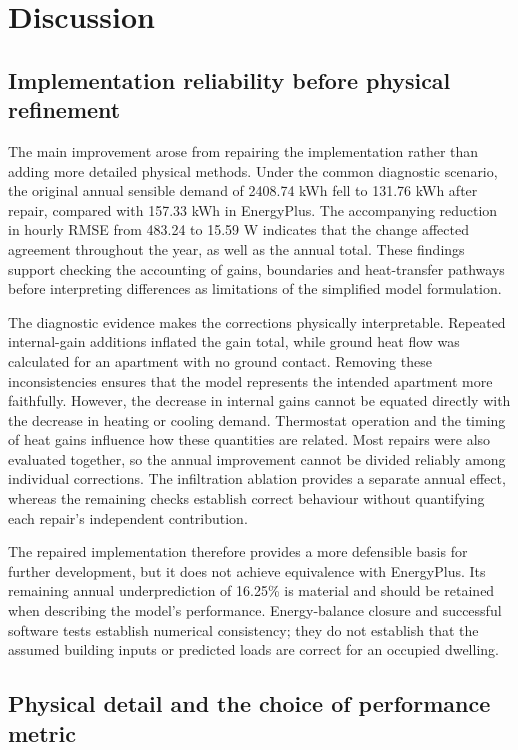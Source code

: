 \section{Discussion}

\subsection{Implementation reliability before physical refinement}

The main improvement arose from repairing the implementation rather than adding more detailed physical methods. Under the common diagnostic scenario, the original annual sensible demand of 2408.74 kWh fell to 131.76 kWh after repair, compared with 157.33 kWh in EnergyPlus. The accompanying reduction in hourly RMSE from 483.24 to 15.59 W indicates that the change affected agreement throughout the year, as well as the annual total. These findings support checking the accounting of gains, boundaries and heat-transfer pathways before interpreting differences as limitations of the simplified model formulation.

The diagnostic evidence makes the corrections physically interpretable. Repeated internal-gain additions inflated the gain total, while ground heat flow was calculated for an apartment with no ground contact. Removing these inconsistencies ensures that the model represents the intended apartment more faithfully. However, the decrease in internal gains cannot be equated directly with the decrease in heating or cooling demand. Thermostat operation and the timing of heat gains influence how these quantities are related. Most repairs were also evaluated together, so the annual improvement cannot be divided reliably among individual corrections. The infiltration ablation provides a separate annual effect, whereas the remaining checks establish correct behaviour without quantifying each repair's independent contribution.

The repaired implementation therefore provides a more defensible basis for further development, but it does not achieve equivalence with EnergyPlus. Its remaining annual underprediction of 16.25\% is material and should be retained when describing the model's performance. Energy-balance closure and successful software tests establish numerical consistency; they do not establish that the assumed building inputs or predicted loads are correct for an occupied dwelling.

\subsection{Physical detail and the choice of performance metric}


